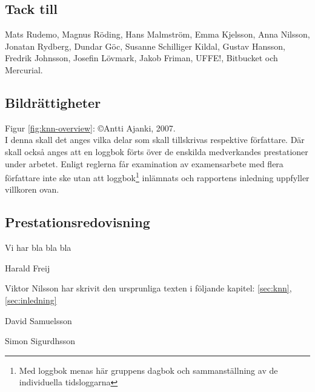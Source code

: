\documentclass[../rapport_MVEX01-11-05]{subfiles}
\begin{document}
    \subsection*{Tack till}
    Mats Rudemo, Magnus Röding, Hans Malmström, Emma Kjelsson, Anna Nilsson, Jonatan Rydberg, Dundar Göc, Susanne Schilliger Kildal, Gustav Hansson, Fredrik Johnsson, Josefin Lövmark, Jakob Friman, UFFE!, Bitbucket och Mercurial.

    \subsection*{Bildrättigheter}
    Figur \ref{fig:knn-overview}: \copyright Antti Ajanki, 2007.\\

    
I denna skall det anges vilka delar som skall tillskrivas respektive
författare. Där skall också anges att en loggbok förts över de
enskilda medverkandes prestationer under arbetet.
Enligt reglerna får examination av examensarbete med flera författare
inte ske utan att loggbok\footnote{Med loggbok menas här gruppens
dagbok och sammanställning av de individuella tidsloggarna} inlämnats
och rapportens inledning uppfyller villkoren ovan.

\subsection*{Prestationsredovisning}
Vi har bla bla bla

Harald Freij

Viktor Nilsson har skrivit den ursprunliga texten i följande kapitel:
\ref{sec:knn}, \ref{sec:inledning}

David Samuelsson

Simon Sigurdhsson
\end{document}
